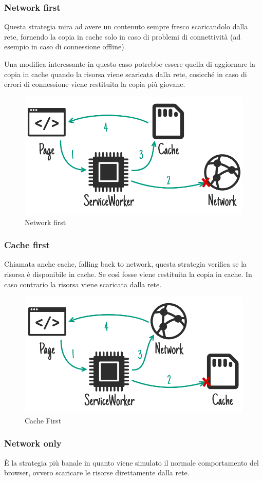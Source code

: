 \documentclass[11pt ,a4paper , twoside , openright ]{article}
\begin{document}
\subsubsection{Network first}
Questa strategia mira ad avere un contenuto sempre fresco scaricandolo dalla rete, fornendo la copia in cache solo in caso di problemi di connettività (ad esempio in caso di connessione offline).

Una modifica interessante in questo caso potrebbe essere quella di aggiornare la copia in cache quando la risorsa viene scaricata dalla rete, cosicché in caso di errori di connessione viene restituita la copia più giovane.

\begin{figure}[h]
	\centering
	\includegraphics[width=0.7\linewidth]{Strategia1}
	\caption{Network first}
	\label{fig: Network first}
\end{figure}
\subsubsection{Cache first}
Chiamata anche cache, falling back to network, questa strategia verifica se la risorsa è disponibile in cache. Se così fosse viene restituita la copia in cache. In caso contrario la risorsa viene scaricata dalla rete.

\begin{figure}[h]
	\centering
	\includegraphics[width=0.7\linewidth]{Strategia2}
	\caption{Cache First}
	\label{fig: Cache First}
\end{figure}
\subsubsection{Network only}
È la strategia più banale in quanto viene simulato il normale comportamento del browser, ovvero scaricare le risorse direttamente dalla rete.
\end{document}

